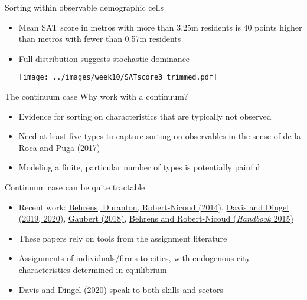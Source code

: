 \documentclass[11pt,notes=hide,aspectratio=169]{beamer}
\begin{document}
\begin{frame}{Sorting within observable demographic cells}
\begin{itemize}
	\item Mean SAT score in metros with more than 3.25m residents is 40 points higher than metros with fewer than 0.57m residents
	\item Full distribution suggests stochastic dominance
	\begin{center}\texttt{[image: ../images/week10/SATscore3\_trimmed.pdf]}\end{center}
\end{itemize}
\end{frame}
\begin{frame}{The continuum case}
Why work with a continuum?
\begin{itemize}
	\item Evidence for sorting on characteristics that are typically not observed
	\item Need at least five types to capture sorting on observables in the sense of de la Roca and Puga (2017)
	\item Modeling a finite, particular number of types is potentially painful
\end{itemize}
Continuum case can be quite tractable
\begin{itemize}
	\item Recent work: \href{https://ideas.repec.org/a/ucp/jpolec/doi10.1086-675534.html}{Behrens, Duranton, Robert-Nicoud (2014)}, \href{http://faculty.chicagobooth.edu/jonathan.dingel/}{Davis and Dingel (2019, 2020)}, \href{https://www.aeaweb.org/articles?id=10.1257/aer.20150361}{Gaubert (2018)}, \href{http://www.sciencedirect.com/science/article/pii/B9780444595171000040}{Behrens and Robert-Nicoud (\emph{Handbook} 2015)}
	\item These papers rely on tools from the assignment literature
	\item Assignments of individuals/firms to cities, with endogenous city characteristics determined in equilibrium
	\item Davis and Dingel (2020) speak to both skills and sectors
\end{itemize}
\end{frame}
\end{document}
